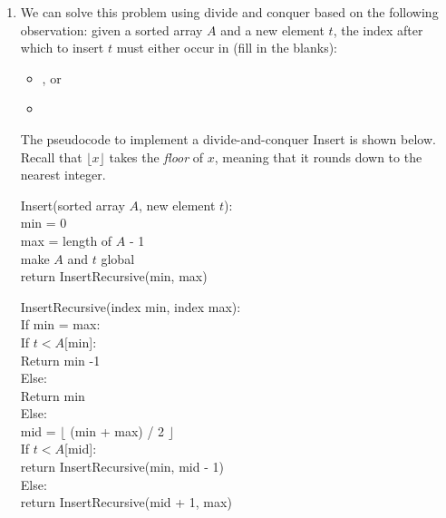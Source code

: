 \documentclass[11pt]{article}
\begin{document}
\begin{enumerate}
\begin{algo}
    NaiveInsert(sorted array $A$, new element $t$):\+\\[2in]
    \hspace{5in}

\end{algo}



\item We can solve this problem using divide and conquer based on the following
observation: given a sorted array $A$ and a new element $t$, the index after
which to insert $t$ must either occur in (fill in the blanks):
\begin{itemize}
    \item \underline{\hspace{4in}}, or
    \item \underline{\hspace{4in}}
\end{itemize}

\newpage

The pseudocode to implement a divide-and-conquer Insert is shown below. Recall
that $\lfloor x \rfloor$ takes the \emph{floor} of $x$, meaning that it rounds
down to the nearest integer.

\begin{algo}
    Insert(sorted array $A$, new element $t$):\+\\
    min = 0\\
    max = length of $A$ - 1\\
    make $A$ and $t$ global\\
    return InsertRecursive(min, max)
\end{algo}

\begin{algo}
    InsertRecursive(index min, index max):\+\\
    If min = max:\+\\
    If $t < A[$min]:\+\\
    Return min -1\-\\
    Else:\+\\
    Return min\-\-\\
    Else:\+\\
    mid = $\lfloor$ (min + max) / 2 $\rfloor$\\
    If $t < A$[mid]:\+\\
    return InsertRecursive(min, mid - 1)\-\\
    Else:\+\\
    return InsertRecursive(mid + 1, max)
\end{algo}


\end{enumerate}
\end{document}
